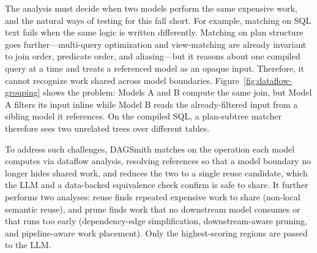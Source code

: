 The analysis must decide when two models perform the same expensive work, and the natural ways of testing for this fall short.
For example, matching on SQL text fails when the same logic is written differently. Matching on plan structure goes further—multi-query optimization and view-matching are already invariant to join order, predicate order, and aliasing—but it reasons about one compiled query at a time and treats a referenced model as an opaque input.
Therefore, it cannot recognize work shared across model boundaries. Figure~\ref{fig:dataflow-grouping} shows the problem: Models A and B compute the same join, but Model A filters its input inline while Model B reads the already-filtered input from a sibling model it references. On the compiled SQL, a plan-subtree matcher therefore sees two unrelated trees over different tables.

To address such challenges, DAGSmith matches on the operation each model computes via dataflow analysis, resolving references so that a model boundary no longer hides shared work, and reduces the two to a single reuse candidate, which the LLM and a data-backed equivalence check confirm is safe to share. It further performs two analyses: reuse finds repeated expensive work to share (non-local semantic reuse), and prune finds work that no downstream model consumes or that runs too early (dependency-edge simplification, downstream-aware pruning, and pipeline-aware work placement). Only the highest-scoring regions are passed to the LLM.


